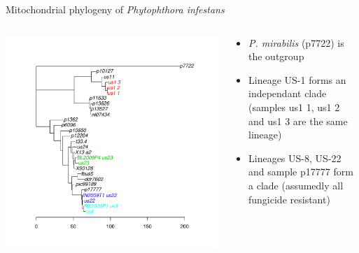 \documentclass[final,t]{beamer}
\begin{document}
\begin{frame}{}
\begin{columns}[t]
\begin{column}{.4\linewidth}
\begin{block}{Mitochondrial phylogeny of \emph{Phytophthora infestans}}
        \begin{columns}[t]
          \begin{column}[T]{0.6\linewidth}
            \includegraphics[width=0.9\linewidth, height=1.2\linewidth]{chromR7.pdf}
          \end{column}
          \begin{column}[T]{0.4\linewidth}
            \begin{itemize}
              \item \emph{P. mirabilis} (p7722) is the outgroup
              \item Lineage US-1 forms an independant clade (samples us1 1, us1 2 and us1 3 are the same lineage)
              \item Lineages US-8, US-22 and sample p17777 form a clade (assumedly all fungicide resistant)
            \end{itemize}
          \end{column}
        \end{columns}
      \end{block}


\end{column}
\end{columns}
\end{frame}
\end{document}
